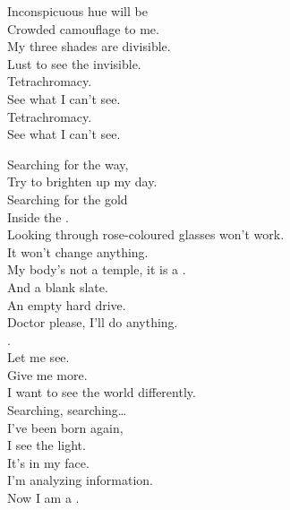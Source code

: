 Inconspicuous hue will be \\
Crowded camouflage to me. \\
My three shades are divisible. \\
Lust to see the invisible. \\

Tetrachromacy. \\
See what I can't see. \\
Tetrachromacy. \\
See what I can't see. \\





Searching for the way, \\
Try to brighten up my day. \\
Searching for the gold \\
Inside the . \\
Looking through rose-coloured glasses won't work. \\
It won't change anything. \\

My body's not a temple, it is a . \\
And a blank slate. \\
An empty hard drive. \\
Doctor please, I'll do anything. \\
. \\
Let me see. \\
Give me more. \\
I want to see the world differently. \\

Searching, searching… \\

I've been born again, \\
I see the light. \\
It's in my face. \\
I'm analyzing information. \\
Now I am a . \\




